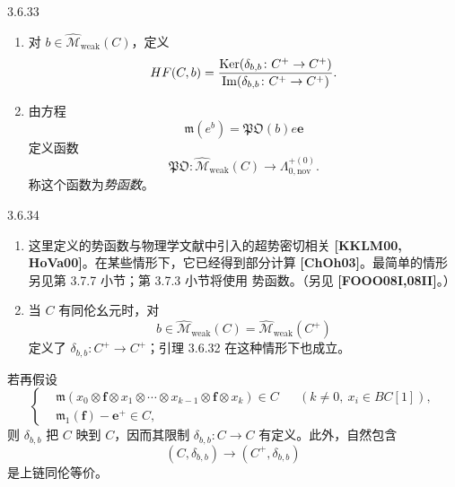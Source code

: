 \begin{definition}{3.6.33}\label{def:3-6-33}
\begin{enumerate}[label=\textup{(\arabic*)},leftmargin=2.8em]
  \item 对 $b\in\widehat{\mathcal M}_{\mathrm{weak}}(C)$，定义
  \[
    HF(C,b)
    =\frac{\operatorname{Ker}(\delta_{b,b}\colon C^+\to C^+)}
    {\operatorname{Im}(\delta_{b,b}\colon C^+\to C^+)}
    \liftIndex{I106}.
  \]

  \item 由方程
  \[
    \mathfrak m(e^b)=\mathfrak{PO}(b)e\mathbf e
  \]
  定义函数
  \[
    \mathfrak{PO}\colon
    \widehat{\mathcal M}_{\mathrm{weak}}(C)
    \longrightarrow\Lambda_{0,\mathrm{nov}}^{+(0)}.
  \]
  称这个函数为\emph{势函数}。
\end{enumerate}
\end{definition}

\begin{remark}{3.6.34}\label{rem:3-6-34}
\begin{enumerate}[label=\textup{(\arabic*)},leftmargin=2.8em]
  \item 这里定义的势函数与物理学文献中引入的超势密切相关
  \textbf{[KKLM00, HoVa00]}。在某些情形下，它已经得到部分计算
  \textbf{[ChOh03]}。最简单的情形另见第 3.7.7 小节；第 3.7.3 小节将使用
  势函数。（另见 \textbf{[FOOO08I,08II]}。）

  \item 当 $C$ 有同伦幺元时，对
  \[
    b\in\widehat{\mathcal M}_{\mathrm{weak}}(C)
    =\widehat{\mathcal M}_{\mathrm{weak}}(C^+)
  \]
  定义了 $\delta_{b,b}\colon C^+\to C^+$；引理 3.6.32 在这种情形下也成立。
\end{enumerate}

若再假设
\begin{equation}
\left\{
\begin{aligned}
&\mathfrak m(x_0\otimes\mathbf f\otimes x_1\otimes\cdots
  \otimes x_{k-1}\otimes\mathbf f\otimes x_k)\in C
  &&(k\ne0,\ x_i\in BC[1]),\\
&\mathfrak m_1(\mathbf f)-\mathbf e^+\in C,
\end{aligned}
\right.
\tag{3.6.35}\label{eq:3-6-35}
\end{equation}
则 $\delta_{b,b}$ 把 $C$ 映到 $C$，因而其限制
$\delta_{b,b}\colon C\to C$ 有定义。此外，自然包含
\[
  (C,\delta_{b,b})\longrightarrow(C^+,\delta_{b,b})
\]
是上链同伦等价。
\end{remark}

